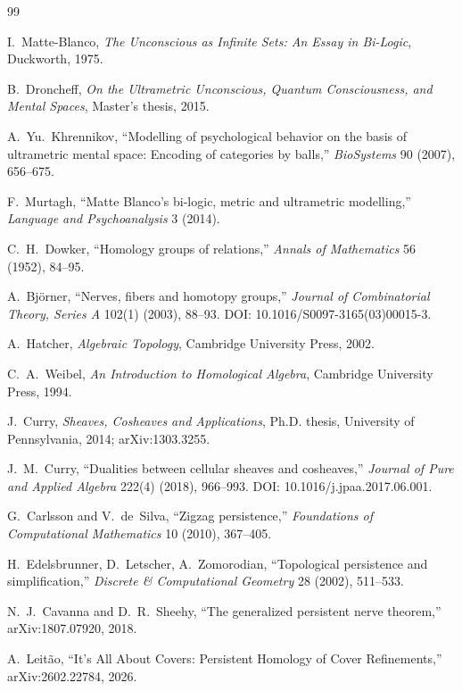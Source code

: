 \documentclass[11pt]{article}
\begin{document}
\begin{thebibliography}{99}
\small

I.~Matte-Blanco,
\emph{The Unconscious as Infinite Sets: An Essay in Bi-Logic},
Duckworth, 1975.

B.~Droncheff,
\emph{On the Ultrametric Unconscious, Quantum Consciousness, and Mental Spaces},
Master's thesis, 2015.

A.~Yu.~Khrennikov,
``Modelling of psychological behavior on the basis of ultrametric mental space: Encoding of categories by balls,''
\emph{BioSystems} 90 (2007), 656--675.

F.~Murtagh,
``Matte Blanco's bi-logic, metric and ultrametric modelling,''
\emph{Language and Psychoanalysis} 3 (2014).

C.~H.~Dowker,
``Homology groups of relations,''
\emph{Annals of Mathematics} 56 (1952), 84--95.

A.~Bj\"orner,
``Nerves, fibers and homotopy groups,''
\emph{Journal of Combinatorial Theory, Series A} 102(1) (2003), 88--93.
DOI: 10.1016/S0097-3165(03)00015-3.

A.~Hatcher,
\emph{Algebraic Topology},
Cambridge University Press, 2002.

C.~A.~Weibel,
\emph{An Introduction to Homological Algebra},
Cambridge University Press, 1994.

J.~Curry,
\emph{Sheaves, Cosheaves and Applications},
Ph.D. thesis, University of Pennsylvania, 2014; arXiv:1303.3255.

J.~M.~Curry,
``Dualities between cellular sheaves and cosheaves,''
\emph{Journal of Pure and Applied Algebra} 222(4) (2018), 966--993.
DOI: 10.1016/j.jpaa.2017.06.001.

G.~Carlsson and V.~de~Silva,
``Zigzag persistence,''
\emph{Foundations of Computational Mathematics} 10 (2010), 367--405.

H.~Edelsbrunner, D.~Letscher, A.~Zomorodian,
``Topological persistence and simplification,''
\emph{Discrete \& Computational Geometry} 28 (2002), 511--533.

N.~J.~Cavanna and D.~R.~Sheehy,
``The generalized persistent nerve theorem,''
arXiv:1807.07920, 2018.

A.~Leit\~ao,
``It's All About Covers: Persistent Homology of Cover Refinements,''
arXiv:2602.22784, 2026.


\end{thebibliography}
\end{document}
